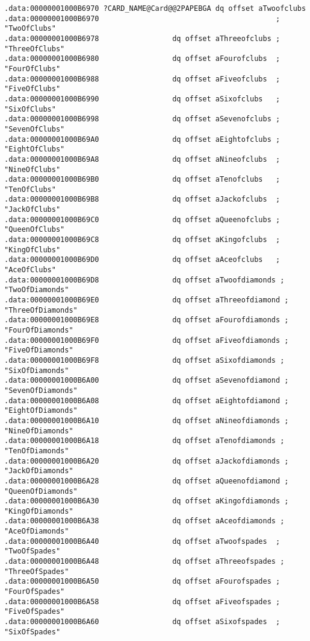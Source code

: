 \begin{lstlisting}
.data:00000001000B6970 ?CARD_NAME@Card@@2PAPEBGA dq offset aTwoofclubs
.data:00000001000B6970                                         ; "TwoOfClubs"
.data:00000001000B6978                 dq offset aThreeofclubs ; "ThreeOfClubs"
.data:00000001000B6980                 dq offset aFourofclubs  ; "FourOfClubs"
.data:00000001000B6988                 dq offset aFiveofclubs  ; "FiveOfClubs"
.data:00000001000B6990                 dq offset aSixofclubs   ; "SixOfClubs"
.data:00000001000B6998                 dq offset aSevenofclubs ; "SevenOfClubs"
.data:00000001000B69A0                 dq offset aEightofclubs ; "EightOfClubs"
.data:00000001000B69A8                 dq offset aNineofclubs  ; "NineOfClubs"
.data:00000001000B69B0                 dq offset aTenofclubs   ; "TenOfClubs"
.data:00000001000B69B8                 dq offset aJackofclubs  ; "JackOfClubs"
.data:00000001000B69C0                 dq offset aQueenofclubs ; "QueenOfClubs"
.data:00000001000B69C8                 dq offset aKingofclubs  ; "KingOfClubs"
.data:00000001000B69D0                 dq offset aAceofclubs   ; "AceOfClubs"
.data:00000001000B69D8                 dq offset aTwoofdiamonds ; "TwoOfDiamonds"
.data:00000001000B69E0                 dq offset aThreeofdiamond ; "ThreeOfDiamonds"
.data:00000001000B69E8                 dq offset aFourofdiamonds ; "FourOfDiamonds"
.data:00000001000B69F0                 dq offset aFiveofdiamonds ; "FiveOfDiamonds"
.data:00000001000B69F8                 dq offset aSixofdiamonds ; "SixOfDiamonds"
.data:00000001000B6A00                 dq offset aSevenofdiamond ; "SevenOfDiamonds"
.data:00000001000B6A08                 dq offset aEightofdiamond ; "EightOfDiamonds"
.data:00000001000B6A10                 dq offset aNineofdiamonds ; "NineOfDiamonds"
.data:00000001000B6A18                 dq offset aTenofdiamonds ; "TenOfDiamonds"
.data:00000001000B6A20                 dq offset aJackofdiamonds ; "JackOfDiamonds"
.data:00000001000B6A28                 dq offset aQueenofdiamond ; "QueenOfDiamonds"
.data:00000001000B6A30                 dq offset aKingofdiamonds ; "KingOfDiamonds"
.data:00000001000B6A38                 dq offset aAceofdiamonds ; "AceOfDiamonds"
.data:00000001000B6A40                 dq offset aTwoofspades  ; "TwoOfSpades"
.data:00000001000B6A48                 dq offset aThreeofspades ; "ThreeOfSpades"
.data:00000001000B6A50                 dq offset aFourofspades ; "FourOfSpades"
.data:00000001000B6A58                 dq offset aFiveofspades ; "FiveOfSpades"
.data:00000001000B6A60                 dq offset aSixofspades  ; "SixOfSpades"

\end{lstlisting}
